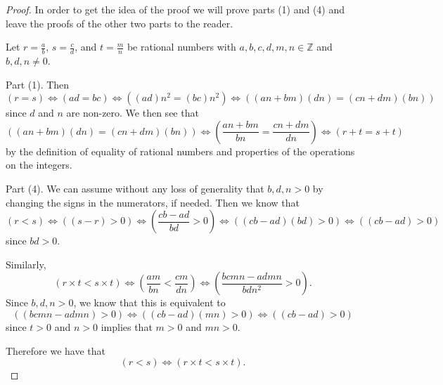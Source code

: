 \documentclass[
]{book}
\theoremstyle{definition}
\theoremstyle{definition}
\theoremstyle{definition}
\theoremstyle{remark}
\begin{document}
\begin{proof}
{}In order to get the idea of the proof we will prove parts (1) and (4) and leave the proofs of the other two parts to the reader.

Let \(r=\frac{a}{b}\), \(s=\frac{c}{d}\), and \(t=\frac{m}{n}\) be rational numbers with \(a,b,c,d,m,n\in \mathbb{Z}\) and \(b,d,n\neq 0\).

Part (1). Then \[(r=s) \Leftrightarrow (ad=bc) \Leftrightarrow \left( (ad)n^2 = (bc) n^2 \right) \Leftrightarrow \left( (an+bm)(dn)=(cn+dm)(bn) \right) \] since \(d\) and \(n\) are non-zero. We then see that
\[\left( (an+bm)(dn)=(cn+dm)(bn) \right) \Leftrightarrow \left(\frac{an+bm}{bn} = \frac{cn+dm}{dn}\right) \Leftrightarrow  (r+t=s+t)\] by the definition of equality of rational numbers and properties of the operations on the integers.

Part (4). We can assume without any loss of generality that \(b,d,n >0\) by changing the signs in the numerators, if needed. Then we know that \[ (r<s) \Leftrightarrow ((s-r)>0 ) \Leftrightarrow \left( \frac{cb-ad}{bd} >0 \right) \Leftrightarrow \left( (cb-ad)(bd) >0\right) \Leftrightarrow \left( (cb-ad) >0\right)\] since \(bd>0\).

Similarly, \[\left( r\times t < s\times t\right) \Leftrightarrow \left( \frac{am}{bn} < \frac{cm}{dn} \right) \Leftrightarrow \left( \frac{bcmn - admn}{bdn^2} >0\right). \] Since \(b,d,n >0\), we know that this is equivalent to
\[\left( (bcmn-admn)>0 \right) \Leftrightarrow \left( (cb-ad)(mn) > 0 \right) \Leftrightarrow \left( (cb-ad) >0 \right)\] since \(t>0\) and \(n>0\) implies that \(m>0\) and \(mn>0\).

Therefore we have that \[(r<s) \Leftrightarrow \left( r\times t < s\times t\right).\]
\end{proof}
\end{document}
